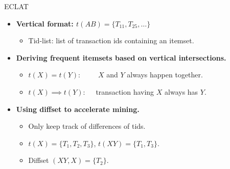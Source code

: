 \begin{frame}{ECLAT}
	\begin{itemize}
		\item \textbf{Vertical format: $t(AB) = \{T_{11},T_{25},\ldots\}$}
		      \begin{itemize}
			      \item Tid-list: list of transaction ids containing an itemset.
		      \end{itemize}
		\item \textbf{Deriving frequent itemsets based on vertical
			      intersections.}
		      \begin{itemize}
			      \item $t(X) = t(Y): \qquad$ \hphantom{.} $X$ and $Y$ always happen
			            together.
			      \item $t(X) \implies t(Y):\quad $ transaction having $X$ always has
			            $Y$.
		      \end{itemize}
		\item \textbf{Using diffset to accelerate mining.}
		      \begin{itemize}
			      \item Only keep track of differences of tids.
			      \item $t(X) = \{T_1,T_2,T_3\}$, $t(XY) = \{T_1,T_3\}$.
			      \item Diffset $(XY,X) = \{T_2\}$.
		      \end{itemize}
	\end{itemize}
\end{frame}

